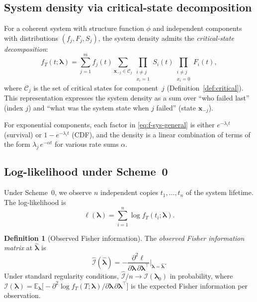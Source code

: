 \documentclass[12pt]{article}
\theoremstyle{definition}
\newtheorem{definition}[theorem]{Definition}
\theoremstyle{remark}
\newcommand{\E}{\mathbb{E}}
\newcommand{\blam}{\boldsymbol{\lambda}}
\begin{document}
\subsection{System density via critical-state decomposition}
\label{sec:system-density}

For a coherent system with structure function $\phi$ and independent
components with distributions $(f_j, F_j, S_j)$, the system density
admits the \emph{critical-state decomposition}:
\begin{equation}\label{eq:f-sys-general}
  f_T(t; \blam) = \sum_{j=1}^m f_j(t) \sum_{\mathbf{x}_{-j} \in \mathcal{C}_j}
  \prod_{\substack{i \neq j \\ x_i = 1}} S_i(t)
  \prod_{\substack{i \neq j \\ x_i = 0}} F_i(t),
\end{equation}
where $\mathcal{C}_j$ is the set of critical states for component~$j$
(Definition~\ref{def:critical}).  This representation expresses the
system density as a sum over ``who failed last'' (index $j$) and ``what
was the system state when $j$ failed'' (state $\mathbf{x}_{-j}$).

For exponential components, each factor in \eqref{eq:f-sys-general}
is either $e^{-\lambda_i t}$ (survival) or $1 - e^{-\lambda_i t}$
(CDF), and the density is a linear combination of terms of the form
$\lambda_j \, e^{-\alpha t}$ for various rate sums $\alpha$.

\subsection{Log-likelihood under Scheme~0}
\label{sec:loglik}

Under Scheme~0, we observe $n$ independent copies
$t_1, \ldots, t_n$ of the system lifetime.  The log-likelihood is
\begin{equation}\label{eq:loglik}
  \ell(\blam) = \sum_{i=1}^n \log f_T(t_i; \blam).
\end{equation}

\begin{definition}[Observed Fisher information]
\label{def:fisher-obs}
The \emph{observed Fisher information matrix} at $\hat{\blam}$ is
\begin{equation}\label{eq:fisher-obs}
  \hat{\mathcal{I}}(\hat{\blam})
  = -\frac{\partial^2 \ell}{\partial \blam \,\partial \blam^\top}
  \bigg|_{\blam = \hat{\blam}}.
\end{equation}
Under standard regularity conditions,
$\hat{\mathcal{I}} / n \to \mathcal{I}(\blam_0)$ in probability, where
$\mathcal{I}(\blam) = \E_{\blam}\bigl[-\partial^2 \log f_T(T; \blam) /
\partial \blam \,\partial \blam^\top\bigr]$
is the expected Fisher information per observation.
\end{definition}
\end{document}
